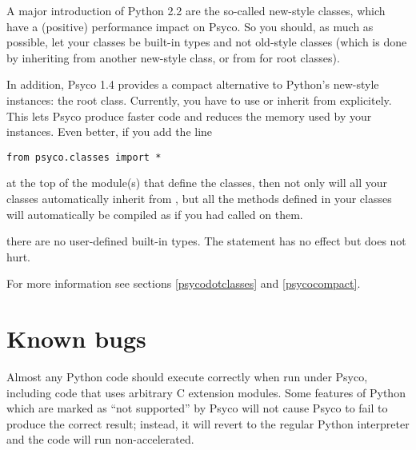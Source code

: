 \documentclass{manual}
\begin{document}
A major introduction of Python 2.2 are the so-called new-style classes, which have a (positive) performance impact on Psyco.  So  you should, as much as possible, let your classes be built-in types and not old-style classes (which is done by inheriting from another new-style class, or from  for root classes).

In addition, Psyco 1.4 provides a compact alternative to Python's new-style instances: the  root class.  Currently, you have to use or inherit from  explicitely.  This lets Psyco produce faster code and reduces the memory used by your instances.  Even better, if you add the line

\begin{verbatim}
from psyco.classes import *
\end{verbatim}

at the top of the module(s) that define the classes, then not only will all your classes automatically inherit from , but all the methods defined in your classes will automatically be compiled as if you had called  on them.


 there are no user-defined built-in types.  The statement  has no effect but does not hurt.

For more information see sections \ref{psycodotclasses} and \ref{psycocompact}.


\section{Known bugs}\label{tutknownbugs}

Almost any Python code should execute correctly when run under Psyco, including code that uses arbitrary C extension modules.  Some features of Python which are marked as ``not supported'' by Psyco will not cause Psyco to fail to produce the correct result; instead, it will revert to the regular Python interpreter and the code will run non-accelerated.
\end{document}
